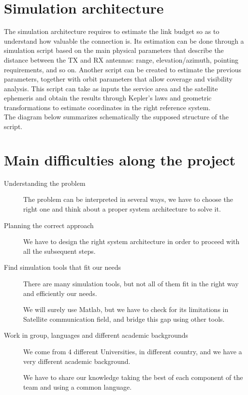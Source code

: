 \documentclass[11pt,a4paper,titlepage]{article}
\begin{document}
\section{Simulation architecture}{
The simulation architecture requires to estimate the link budget so as to understand how valuable the connection is. Its estimation can be done through a simulation script based on the main physical parameters that describe the distance between the TX and RX antennas: range, elevation/azimuth, pointing requirements, and so on.
Another script can be created to estimate the previous parameters, together with orbit parameters that allow coverage and visibility analysis. This script can take as inputs the service area and the satellite ephemeris and obtain the results through Kepler’s laws and geometric transformations to estimate coordinates in the right reference system.\\
The diagram below summarizes schematically the supposed structure of the script.

\begin{center}
\label{fig:flow}
\end{center}
}

\section{Main difficulties along the project}{
	\begin{description}
		\item [Understanding the problem] The problem can be interpreted in several ways, we have to choose the right one and think about a proper system architecture to solve it.
		\item [Planning the correct approach] We have to design the right system architecture in order to proceed with all the subsequent steps.
		\item [Find simulation tools that fit our needs] There are many simulation tools, but not all of them fit in the right way and efficiently our needs.

		We will surely use Matlab, but we have to check for its limitations in Satellite communication field, and bridge this gap using other tools.
		\item [Work in group, languages and different academic backgrounds] We come from 4 different Universities, in different country, and we have a very different academic background.

		We have to share our knowledge taking the best of each component of the team and using a common language.
	\end{description}
}
\end{document}
